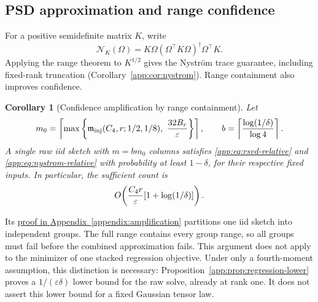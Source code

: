 \documentclass[11pt,a4paper]{article}
\newtheorem{corollary}[theorem]{Corollary}
\theoremstyle{definition}\newtheorem{definition}[theorem]{Definition}
\theoremstyle{remark}\newtheorem{remark}[theorem]{Remark}
\numberwithin{equation}{section}
\begin{document}
\subsection{PSD approximation and range confidence}
For a positive semidefinite matrix $K$, write
\[
 \mathcal N_K(\Omega)
 =K\Omega(\Omega^\top K\Omega)^\dagger\Omega^\top K.
\]
Applying the range theorem to $K^{1/2}$ gives the Nystr\"om trace
guarantee, including fixed-rank truncation
(Corollary~\ref{app:cor:nystrom}). Range containment also improves confidence.
\begin{corollary}[Confidence amplification by range containment]
\label{app:cor:amplification}
Let
\[
 m_0=\left\lceil\max\left\{\mathfrak m_{\rm inj}({C_4},r;1/2,1/8),\ \frac{32B_r}{\varepsilon}\right\}\right\rceil,
 \qquad b=\left\lceil\frac{\log(1/\delta)}{\log4}\right\rceil.
\]
A single raw iid sketch with $m=bm_0$ columns satisfies
\eqref{app:eq:rsvd-relative} and \eqref{app:eq:nystrom-relative} with
probability at least $1-\delta$, for their respective fixed inputs. In
particular, the sufficient count is
\[
 O\!\left(\frac{{C_4} r}{\varepsilon}[1+\log(1/\delta)]\right).
\]
\end{corollary}
Its \hyperref[proof:amplification]{proof in Appendix~\ref*{appendix:amplification}} partitions one iid
sketch into independent groups. The full range contains every group
range, so all groups must fail before the combined approximation fails.
This argument does not apply to the minimizer of one stacked regression
objective. Under only a fourth-moment assumption, this distinction is
necessary: Proposition~\ref{app:prop:regression-lower} proves a
$1/(\varepsilon\delta)$ lower bound for the raw solve, already at rank one.
It does not assert this lower bound for a fixed Gaussian tensor law.
\end{document}
